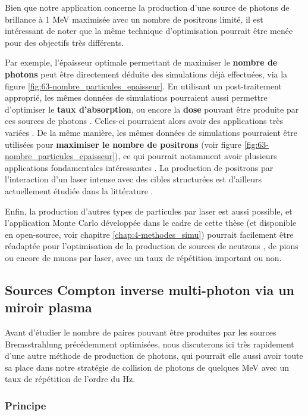 \begin{refsection}
Bien que notre application concerne la production d'une source de photons de brillance à 1 MeV maximisée avec un nombre de positrons limité, il est intéressant de noter que la même technique d'optimisation pourrait être menée pour des objectifs très différents.

Par exemple, l'épaisseur optimale permettant de maximiser le \textbf{nombre de photons} peut être directement déduite des simulations déjà effectuées, via la figure \ref{fig:63-nombre_particules_epaisseur}. En utilisant un post-traitement approprié, les mêmes données de simulations pourraient aussi permettre d'optimiser le \textbf{taux d'absorption}, ou encore la \textbf{dose} pouvant être produite par ces sources de photons \parencite{compantlafontaine_2014}. Celles-ci pourraient alors avoir des applications très variées \parencite{albert_2016}. De la même manière, les mêmes données de simulations pourraient être utilisées pour \textbf{maximiser le nombre de positrons} (voir figure \ref{fig:63-nombre_particules_epaisseur}), ce qui pourrait notamment avoir plusieurs applications fondamentales intéressantes \parencite{muller_2009}. La production de positrons par l'interaction d'un laser intense avec des cibles structurées est d'ailleurs actuellement étudiée dans la littérature \parencite{wang_2020b}.

Enfin, la production d'autres types de particules par laser est aussi possible, et l'application Monte Carlo développée dans le cadre de cette thèse (et disponible en open-source, voir chapitre \ref{chap:4-methodes_simu}) pourrait facilement être réadaptée pour l'optimisation de la production de sources de neutrons \parencite{shkolnikov_1997}, de pions \parencite{dipiazza_2012, schumaker_2018} ou encore de muons \parencite{dipiazza_2012} par laser, avec un taux de répétition important ou non. 

\subsection{Sources Compton inverse multi-photon via un miroir plasma}

Avant d'étudier le nombre de paires pouvant être produites par les sources Bremsstrahlung précédemment optimisées, nous discuterons ici très rapidement d'une autre méthode de production de photons, qui pourrait elle aussi avoir toute sa place dans notre stratégie de collision de photons de quelques MeV avec un taux de répétition de l'ordre du Hz. 

\subsubsection{Principe}


\end{refsection}
